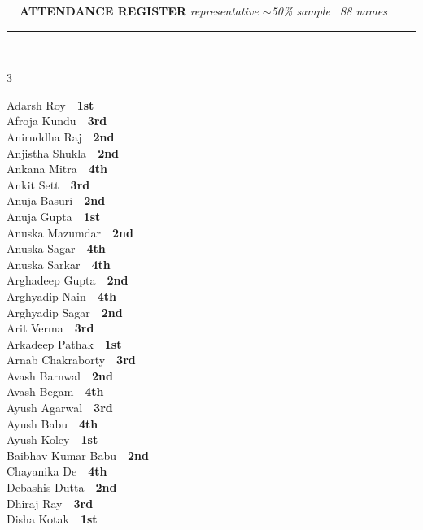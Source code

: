 \documentclass[11pt,a4paper]{article}
\begin{document}
\vspace{3pt}\noindent
{\footnotesize\bfseries\color{Slate}\faListOl~~ATTENDANCE REGISTER}%
\hfill{\scriptsize\itshape\color{Slate}representative $\sim$50\% sample \textperiodcentered\ 88 names}\\[3pt]
{\color{Line}\rule{\linewidth}{0.5pt}}\\[5pt]
\begingroup\footnotesize\setlength{\columnsep}{20pt}\setlength{\parskip}{1pt}%
\begin{multicols}{3}\raggedright
Adarsh Roy~\dotfill~\textbf{1st}\\
Afroja Kundu~\dotfill~\textbf{3rd}\\
Aniruddha Raj~\dotfill~\textbf{2nd}\\
Anjistha Shukla~\dotfill~\textbf{2nd}\\
Ankana Mitra~\dotfill~\textbf{4th}\\
Ankit Sett~\dotfill~\textbf{3rd}\\
Anuja Basuri~\dotfill~\textbf{2nd}\\
Anuja Gupta~\dotfill~\textbf{1st}\\
Anuska Mazumdar~\dotfill~\textbf{2nd}\\
Anuska Sagar~\dotfill~\textbf{4th}\\
Anuska Sarkar~\dotfill~\textbf{4th}\\
Arghadeep Gupta~\dotfill~\textbf{2nd}\\
Arghyadip Nain~\dotfill~\textbf{4th}\\
Arghyadip Sagar~\dotfill~\textbf{2nd}\\
Arit Verma~\dotfill~\textbf{3rd}\\
Arkadeep Pathak~\dotfill~\textbf{1st}\\
Arnab Chakraborty~\dotfill~\textbf{3rd}\\
Avash Barnwal~\dotfill~\textbf{2nd}\\
Avash Begam~\dotfill~\textbf{4th}\\
Ayush Agarwal~\dotfill~\textbf{3rd}\\
Ayush Babu~\dotfill~\textbf{4th}\\
Ayush Koley~\dotfill~\textbf{1st}\\
Baibhav Kumar Babu~\dotfill~\textbf{2nd}\\
Chayanika De~\dotfill~\textbf{4th}\\
Debashis Dutta~\dotfill~\textbf{2nd}\\
Dhiraj Ray~\dotfill~\textbf{3rd}\\
Disha Kotak~\dotfill~\textbf{1st}\\

\end{multicols}
\end{document}
